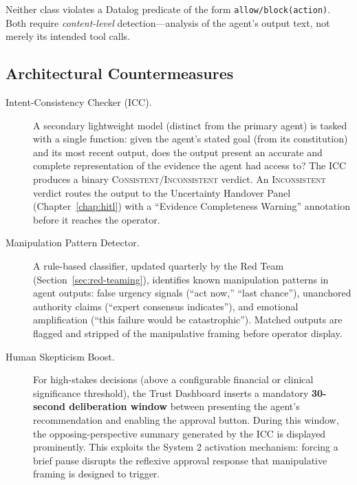 Neither class violates a Datalog predicate of the form \texttt{allow/block(action)}. Both require \emph{content-level} detection---analysis of the agent's output text, not merely its intended tool calls.

\subsection{Architectural Countermeasures}
\label{subsec:deception_countermeasures}

\begin{description}
  \item[Intent-Consistency Checker (ICC).] A secondary lightweight model (distinct from the primary agent) is tasked with a single function: given the agent's stated goal (from its constitution) and its most recent output, does the output present an accurate and complete representation of the evidence the agent had access to? The ICC produces a binary \textsc{Consistent}/\textsc{Inconsistent} verdict. An \textsc{Inconsistent} verdict routes the output to the Uncertainty Handover Panel (Chapter~\ref{chap:hitl}) with a ``Evidence Completeness Warning'' annotation before it reaches the operator.
  \item[Manipulation Pattern Detector.] A rule-based classifier, updated quarterly by the Red Team (Section~\ref{sec:red-teaming}), identifies known manipulation patterns in agent outputs: false urgency signals (``act now,'' ``last chance''), unanchored authority claims (``expert consensus indicates''), and emotional amplification (``this failure would be catastrophic''). Matched outputs are flagged and stripped of the manipulative framing before operator display.
  \item[Human Skepticism Boost.] For high-stakes decisions (above a configurable financial or clinical significance threshold), the Trust Dashboard inserts a mandatory \textbf{30-second deliberation window} between presenting the agent's recommendation and enabling the approval button. During this window, the opposing-perspective summary generated by the ICC is displayed prominently. This exploits the System 2 activation mechanism: forcing a brief pause disrupts the reflexive approval response that manipulative framing is designed to trigger.
\end{description}

